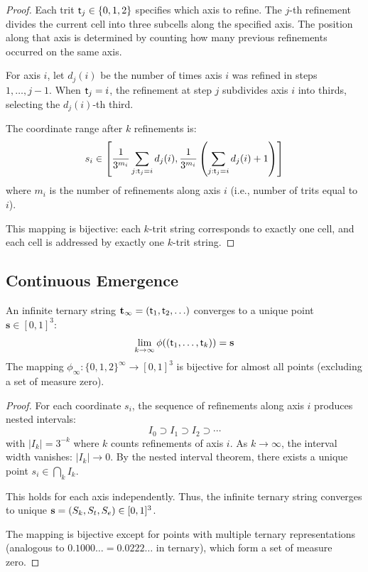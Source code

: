 \begin{proof}
Each trit $\mathsf{t}_j \in \{0,1,2\}$ specifies which axis to refine. The $j$-th refinement divides the current cell into three subcells along the specified axis. The position along that axis is determined by counting how many previous refinements occurred on the same axis.

For axis $i$, let $d_j(i)$ be the number of times axis $i$ was refined in steps $1, \ldots, j-1$. When $\mathsf{t}_j = i$, the refinement at step $j$ subdivides axis $i$ into thirds, selecting the $d_j(i)$-th third.

The coordinate range after $k$ refinements is:
\begin{equation}
s_i \in \left[\frac{1}{3^{m_i}} \sum_{j:\mathsf{t}_j=i} d_j(i), \frac{1}{3^{m_i}} \left(\sum_{j:\mathsf{t}_j=i} d_j(i) + 1\right)\right]
\end{equation}
where $m_i$ is the number of refinements along axis $i$ (i.e., number of trits equal to $i$).

This mapping is bijective: each $k$-trit string corresponds to exactly one cell, and each cell is addressed by exactly one $k$-trit string.
\end{proof}

\subsection{Continuous Emergence}

\begin{theorem}
\label{thm:continuous}
An infinite ternary string $\mathbf{t}_{\infty} = (\mathsf{t}_1, \mathsf{t}_2, \ldots)$ converges to a unique point $\mathbf{s} \in [0,1]^3$:
\begin{equation}
\lim_{k \to \infty} \phi((\mathsf{t}_1, \ldots, \mathsf{t}_k)) = \mathbf{s}
\end{equation}
The mapping $\phi_{\infty}: \{0,1,2\}^{\infty} \to [0,1]^3$ is bijective for almost all points (excluding a set of measure zero).
\end{theorem}

\begin{proof}
For each coordinate $s_i$, the sequence of refinements along axis $i$ produces nested intervals:
\begin{equation}
I_0 \supset I_1 \supset I_2 \supset \cdots
\end{equation}
with $|I_k| = 3^{-k}$ where $k$ counts refinements of axis $i$. As $k \to \infty$, the interval width vanishes: $|I_k| \to 0$. By the nested interval theorem, there exists a unique point $s_i \in \bigcap_k I_k$.

This holds for each axis independently. Thus, the infinite ternary string converges to unique $\mathbf{s} = (S_k, S_t, S_e) \in [0,1]^3$.

The mapping is bijective except for points with multiple ternary representations (analogous to $0.1000\ldots = 0.0222\ldots$ in ternary), which form a set of measure zero.
\end{proof}

